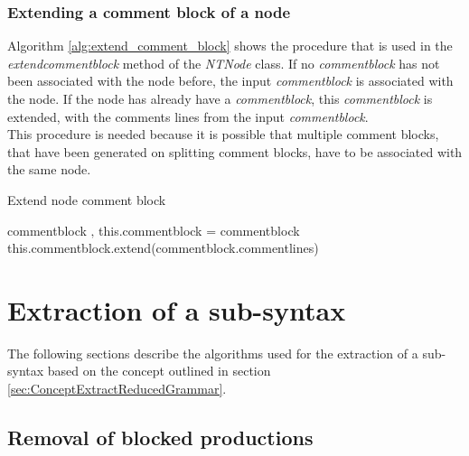 \subsubsection{Extending a comment block of a node}\label{sec:ImplementationMaintainingExtendCommentBlock}

Algorithm \ref{alg:extend_comment_block} shows the procedure that is used in the \textit{extend\textunderscore comment\textunderscore block} method of the \textit{NTNode} class.
If no \textit{comment\textunderscore block} has not been associated with the node before, the input \textit{comment\textunderscore block} is associated with the node.
If the node has already have a \textit{comment\textunderscore block}, this \textit{comment\textunderscore block} is extended, with the comments lines from the input \textit{comment\textunderscore block}.\\
This procedure is needed because it is possible that multiple comment blocks, that have been generated on splitting comment blocks, have to be associated with the same node.

\begin{algorithm}[H]
\small
\caption{Extend node comment block}
\begin{algorithmic}[1]
\algrenewcommand\algorithmicindent{0.4em}
\Require comment\textunderscore block
‚
	\State this.comment\textunderscore block = comment\textunderscore block
\Else
	\State this.comment\textunderscore block.extend(comment\textunderscore block.comment\textunderscore lines)
\EndIf
\end{algorithmic}
\label{alg:extend_comment_block}
\end{algorithm}

\section{Extraction of a sub-syntax}\label{sec:ImplementationExtractReducedGrammar}

The following sections describe the algorithms used for the extraction of a sub-syntax based on the concept outlined in section \ref{sec:ConceptExtractReducedGrammar}.

\subsection{Removal of blocked productions}


